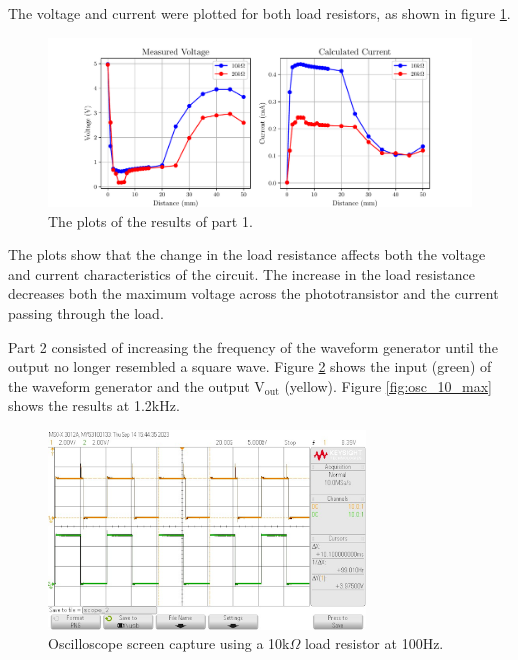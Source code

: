 \documentclass[CMPE]{KGCOEReport}
\begin{document}
The voltage and current were plotted for both load resistors, as shown in figure \ref{fig:plots}.

\begin{figure}[H]
    \centering
    \includegraphics[width=1\textwidth]{results_plot.pdf}
    \caption{The plots of the results of part 1.}
    \label{fig:plots}
\end{figure}

The plots show that the change in the load resistance affects both the voltage and current characteristics of the circuit. The increase in the load resistance decreases both the maximum voltage across the phototransistor and the current passing through the load.

Part 2 consisted of increasing the frequency of the waveform generator until the output no longer resembled a square wave. Figure \ref{fig:osc_10_min} shows the input (green) of the waveform generator and the output V$_\text{out}$ (yellow). Figure \ref{fig:osc_10_max} shows the results at 1.2kHz.

\begin{figure}[H]
    \centering
    \includegraphics[width=0.75\textwidth]{output_min_10.png}
    \caption{Oscilloscope screen capture using a 10k$\Omega$ load resistor at 100Hz.}
    \label{fig:osc_10_min}
\end{figure}
\end{document}
